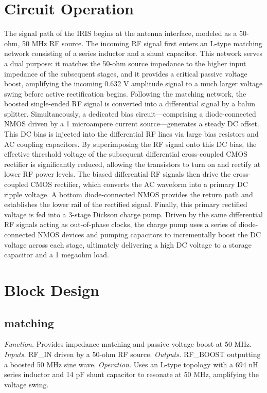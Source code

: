 \documentclass{ieeeaccess}
\begin{document}
\section{Circuit Operation}
The signal path of the IRIS begins at the antenna interface, modeled as a 50-ohm, 50 MHz RF source. The incoming RF signal first enters an L-type matching network consisting of a series inductor and a shunt capacitor. This network serves a dual purpose: it matches the 50-ohm source impedance to the higher input impedance of the subsequent stages, and it provides a critical passive voltage boost, amplifying the incoming 0.632 V amplitude signal to a much larger voltage swing before active rectification begins.
Following the matching network, the boosted single-ended RF signal is converted into a differential signal by a balun splitter. Simultaneously, a dedicated bias circuit---comprising a diode-connected NMOS driven by a 1 microampere current source---generates a steady DC offset. This DC bias is injected into the differential RF lines via large bias resistors and AC coupling capacitors. By superimposing the RF signal onto this DC bias, the effective threshold voltage of the subsequent differential cross-coupled CMOS rectifier is significantly reduced, allowing the transistors to turn on and rectify at lower RF power levels.
The biased differential RF signals then drive the cross-coupled CMOS rectifier, which converts the AC waveform into a primary DC ripple voltage. A bottom diode-connected NMOS provides the return path and establishes the lower rail of the rectified signal. Finally, this primary rectified voltage is fed into a 3-stage Dickson charge pump. Driven by the same differential RF signals acting as out-of-phase clocks, the charge pump uses a series of diode-connected NMOS devices and pumping capacitors to incrementally boost the DC voltage across each stage, ultimately delivering a high DC voltage to a storage capacitor and a 1 megaohm load.
\section{Block Design}
\subsection{matching}
\textit{Function.} Provides impedance matching and passive voltage boost at 50 MHz.
\textit{Inputs.} RF\_IN driven by a 50-ohm RF source.
\textit{Outputs.} RF\_BOOST outputting a boosted 50 MHz sine wave.
\textit{Operation.} Uses an L-type topology with a 694 nH series inductor and 14 pF shunt capacitor to resonate at 50 MHz, amplifying the voltage swing.
\end{document}
